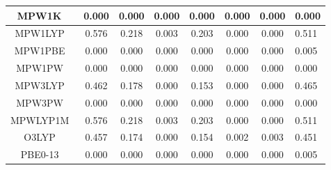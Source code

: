 \begin{tabular}{|c|c|c|c|c|c|c|l|}
                                      MPW1K~\cite{Lynch2000_4811} &                0.000 &                          0.000 &             0.000 &                        0.000 &                0.000 &                0.000 &                       0.000 \\ \hline
                                     MPW1LYP~\cite{Adamo1998_664} &                0.576 &                          0.218 &             0.003 &                        0.203 &                0.000 &                0.000 &                       0.511 \\ \hline
                                     MPW1PBE~\cite{Adamo1998_664} &                0.000 &                          0.000 &             0.000 &                        0.000 &                0.000 &                0.000 &                       0.005 \\ \hline
                                      MPW1PW~\cite{Adamo1998_664} &                0.000 &                          0.000 &             0.000 &                        0.000 &                0.000 &                0.000 &                       0.000 \\ \hline
                                     MPW3LYP~\cite{Zhao2004_6908} &                0.462 &                          0.178 &             0.000 &                        0.153 &                0.000 &                0.000 &                       0.465 \\ \hline
                                      MPW3PW~\cite{Adamo1998_664} &                0.000 &                          0.000 &             0.000 &                        0.000 &                0.000 &                0.000 &                       0.000 \\ \hline
                                MPWLYP1M~\cite{Schultz2005_11127} &                0.576 &                          0.218 &             0.003 &                        0.203 &                0.000 &                0.000 &                       0.511 \\ \hline
                                       O3LYP~\cite{Cohen2001_607} &                0.457 &                          0.174 &             0.000 &                        0.154 &                0.002 &                0.003 &                       0.451 \\ \hline
                                PBE0-13~\cite{Cortona2012_086101} &                0.000 &                          0.000 &             0.000 &                        0.000 &                0.000 &                0.000 &                       0.005 \\ \hline

\end{tabular}
